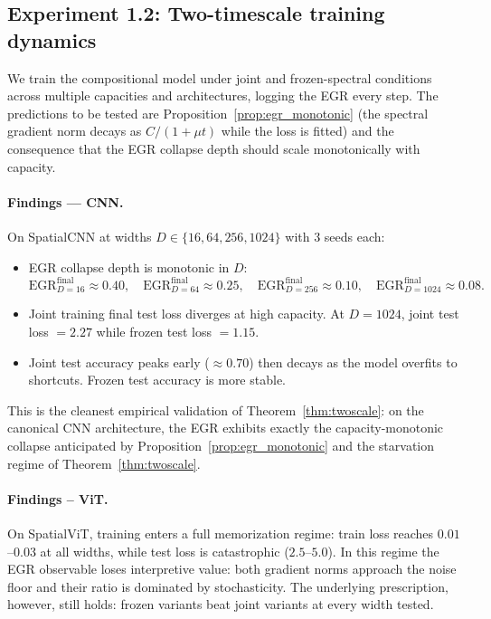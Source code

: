 \subsection{Experiment 1.2: Two-timescale training dynamics}

We train the compositional model under joint and frozen-spectral
conditions across multiple capacities and architectures, logging the
EGR every step. The predictions to be tested are
Proposition~\ref{prop:egr_monotonic} (the spectral gradient norm
decays as $C/(1 + \mu t)$ while the loss is fitted) and the
consequence that the EGR collapse depth should scale monotonically
with capacity.

\paragraph{Findings — CNN.} On SpatialCNN at widths $D \in \{16, 64,
256, 1024\}$ with 3 seeds each:
\begin{itemize}
    \item EGR collapse depth is monotonic in $D$:
          \[
              \mathrm{EGR}^{\mathrm{final}}_{D=16} \approx 0.40, \quad
              \mathrm{EGR}^{\mathrm{final}}_{D=64} \approx 0.25, \quad
              \mathrm{EGR}^{\mathrm{final}}_{D=256} \approx 0.10, \quad
              \mathrm{EGR}^{\mathrm{final}}_{D=1024} \approx 0.08.
          \]
    \item Joint training final test loss diverges at high capacity. At
          $D=1024$, joint test loss $= 2.27$ while frozen test loss
          $= 1.15$.
    \item Joint test accuracy peaks early ($\approx 0.70$) then
          decays as the model overfits to shortcuts. Frozen test
          accuracy is more stable.
\end{itemize}
This is the cleanest empirical validation of Theorem~\ref{thm:twoscale}:
on the canonical CNN architecture, the EGR exhibits exactly the
capacity-monotonic collapse anticipated by
Proposition~\ref{prop:egr_monotonic} and the starvation regime of
Theorem~\ref{thm:twoscale}.

\paragraph{Findings -- ViT.} On SpatialViT, training enters a full
memorization regime: train loss reaches $0.01$--$0.03$ at all widths,
while test loss is catastrophic ($2.5$--$5.0$). In this regime the
EGR observable loses interpretive value: both gradient norms approach
the noise floor and their ratio is dominated by stochasticity. The
underlying prescription, however, still holds: frozen variants beat
joint variants at every width tested.

